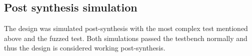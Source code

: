 \documentclass[]{article}
\begin{document}

\subsection{Post synthesis simulation} %
The design was simulated post-synthesis with the most complex test mentioned above and the fuzzed test. Both simulations passed the testbench normally and thus the design is considered working post-synthesis.
\label{sub:post_synthesis_simulation}

\end{document}
